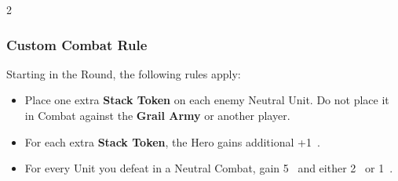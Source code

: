 \begin{multicols}{2}
\subsubsection*{Custom Combat Rule}

Starting in the  Round, the following rules apply:

\begin{itemize}
  \item Place one extra \textbf{Stack Token} on each enemy Neutral  Unit. Do not place it in Combat against the \textbf{Grail Army} or another player.
  \item For each extra \textbf{Stack Token}, the Hero gains additional +1~.
  \item For every  Unit you defeat in a Neutral Combat, gain 5~ and either 2~ or 1~.
\end{itemize}


\end{multicols}

